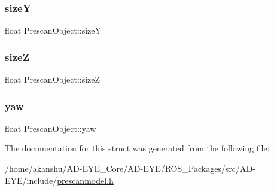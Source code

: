 \subsubsection{\texorpdfstring{sizeY}{sizeY}}
{\footnotesize\ttfamily float Prescan\+Object\+::sizeY}

\mbox{\label{structPrescanObject_ad0f71d984cb7b023167718522ef6f00e}} 
\subsubsection{\texorpdfstring{sizeZ}{sizeZ}}
{\footnotesize\ttfamily float Prescan\+Object\+::sizeZ}

\mbox{\label{structPrescanObject_ad769052d95fb1e3a416e6d01aa1d3171}} 
\subsubsection{\texorpdfstring{yaw}{yaw}}
{\footnotesize\ttfamily float Prescan\+Object\+::yaw}



The documentation for this struct was generated from the following file\+:\begin{DoxyCompactItemize}
\item 
/home/akanshu/\+A\+D-\/\+E\+Y\+E\+\_\+\+Core/\+A\+D-\/\+E\+Y\+E/\+R\+O\+S\+\_\+\+Packages/src/\+A\+D-\/\+E\+Y\+E/include/\hyperlink{prescanmodel_8h}{prescanmodel.\+h}\end{DoxyCompactItemize}
